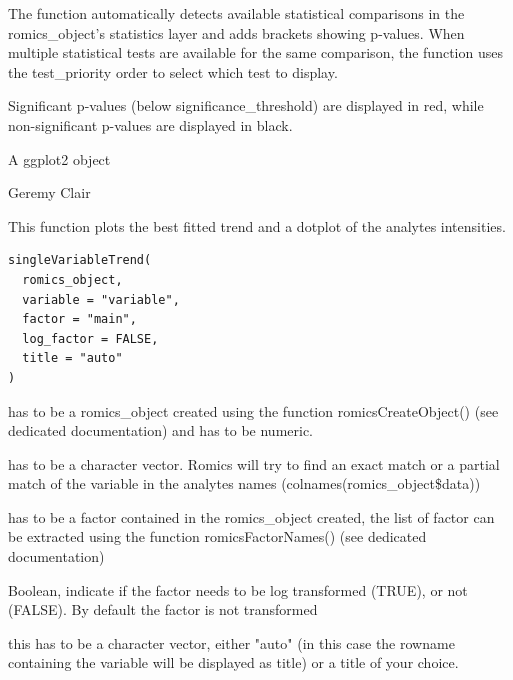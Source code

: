\documentclass[a4paper]{book}
\begin{document}
%
\begin{Details}
The function automatically detects available statistical comparisons in the romics\_object's statistics layer
and adds brackets showing p-values. When multiple statistical tests are available for the same comparison,
the function uses the test\_priority order to select which test to display.

Significant p-values (below significance\_threshold) are displayed in red, while non-significant p-values
are displayed in black.
\end{Details}
%
\begin{Value}
A ggplot2 object
\end{Value}
%
\begin{Author}
Geremy Clair
\end{Author}
%
\begin{Description}
This function plots the best fitted trend and a dotplot of the analytes intensities.
\end{Description}
%
\begin{Usage}
\begin{verbatim}
singleVariableTrend(
  romics_object,
  variable = "variable",
  factor = "main",
  log_factor = FALSE,
  title = "auto"
)
\end{verbatim}
\end{Usage}
%
\begin{Arguments}
\begin{ldescription}
\item[\code{romics\_object}] has to be a romics\_object created using the function romicsCreateObject() (see dedicated documentation) and has to be numeric.

\item[\code{variable}] has to be a character vector. Romics will try to find an exact match or a partial match of the variable in the analytes names (colnames(romics\_object\$data))

\item[\code{factor}] has to be a factor contained in the romics\_object created, the list of factor can be extracted using the function romicsFactorNames() (see dedicated documentation)

\item[\code{log\_factor}] Boolean, indicate if the factor needs to be log transformed (TRUE), or not (FALSE). By default the factor is not transformed

\item[\code{title}] this has to be a character vector, either "auto" (in this case the rowname containing the variable will be displayed as title) or a title of your choice.
\end{ldescription}
\end{Arguments}
\end{document}
